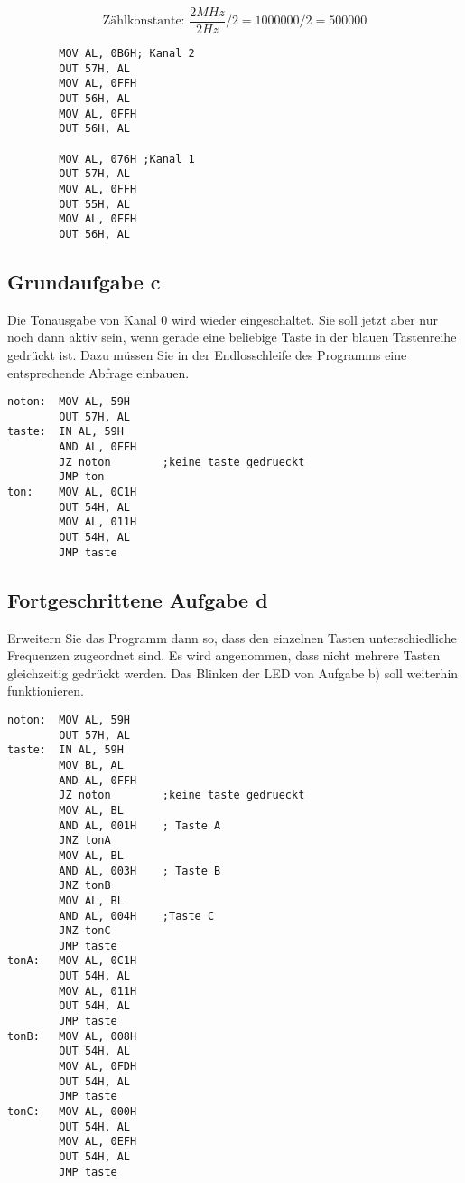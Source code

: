 \documentclass[a4paper,10pt,titlepage]{scrartcl}
\begin{document}
$$\text{Zählkonstante: } \frac{2 MHz}{2 Hz} /2 = 1000000 / 2 = 500000$$
\begin{lstlisting}
        MOV AL, 0B6H; Kanal 2
        OUT 57H, AL
        MOV AL, 0FFH
        OUT 56H, AL
        MOV AL, 0FFH
        OUT 56H, AL

        MOV AL, 076H ;Kanal 1
        OUT 57H, AL
        MOV AL, 0FFH
        OUT 55H, AL
        MOV AL, 0FFH
        OUT 56H, AL

\end{lstlisting}

\subsection*{Grundaufgabe c}
Die Tonausgabe von Kanal 0 wird wieder eingeschaltet. Sie soll jetzt aber nur noch dann aktiv sein, wenn gerade eine beliebige Taste in der blauen Tastenreihe gedrückt ist. Dazu müssen Sie in der Endlosschleife des Programms eine entsprechende Abfrage einbauen.

\begin{lstlisting}
noton:  MOV AL, 59H
        OUT 57H, AL
taste:  IN AL, 59H
        AND AL, 0FFH
        JZ noton        ;keine taste gedrueckt
        JMP ton
ton:    MOV AL, 0C1H
        OUT 54H, AL
        MOV AL, 011H
        OUT 54H, AL
        JMP taste
\end{lstlisting}

\subsection*{Fortgeschrittene Aufgabe d}
Erweitern Sie das Programm dann so, dass den einzelnen Tasten unterschiedliche Frequenzen zugeordnet sind. Es wird angenommen, dass nicht mehrere Tasten gleichzeitig gedrückt werden. Das  Blinken  der  LED  von  Aufgabe  b)  soll  weiterhin  funktionieren.

\begin{lstlisting}
noton:  MOV AL, 59H
        OUT 57H, AL
taste:  IN AL, 59H
        MOV BL, AL
        AND AL, 0FFH
        JZ noton        ;keine taste gedrueckt
        MOV AL, BL
        AND AL, 001H    ; Taste A
        JNZ tonA
        MOV AL, BL
        AND AL, 003H    ; Taste B
        JNZ tonB
        MOV AL, BL
        AND AL, 004H    ;Taste C
        JNZ tonC
        JMP taste
tonA:   MOV AL, 0C1H
        OUT 54H, AL
        MOV AL, 011H
        OUT 54H, AL
        JMP taste
tonB:   MOV AL, 008H
        OUT 54H, AL
        MOV AL, 0FDH
        OUT 54H, AL
        JMP taste
tonC:   MOV AL, 000H
        OUT 54H, AL
        MOV AL, 0EFH
        OUT 54H, AL
        JMP taste
\end{lstlisting}
\end{document}
